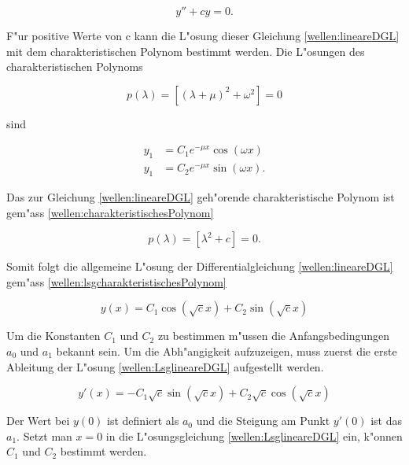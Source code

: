 \begin{refsection}
\begin{equation}
	y''+ cy = 0.
	\label{wellen:lineareDGL}
\end{equation}


F"ur positive Werte von c kann die L"osung dieser Gleichung 
\ref{wellen:lineareDGL} mit dem charakteristischen Polynom bestimmt werden. 
Die L"osungen des charakteristischen Polynoms

\begin{equation}
	p(\lambda) = [(\lambda+\mu)^2+\omega^2] =0
	\label{wellen:charakteristischesPolynom}
\end{equation}

sind

\begin{equation}
	\begin{split}
	y_1 &= C_1e^{-\mu x}\cos(\omega x) \\
	y_1 &= C_2e^{-\mu x}\sin(\omega x).
	\end{split}
	\label{wellen:lsgcharakteristischesPolynom}
\end{equation}

Das zur Gleichung \ref{wellen:lineareDGL} geh"orende charakteristische Polynom 
ist gem"ass \ref{wellen:charakteristischesPolynom}

\begin{equation*}
	p(\lambda) = [\lambda^2 + c] =0.
\end{equation*}

Somit folgt die allgemeine L"osung der Differentialgleichung 
\ref{wellen:lineareDGL} gem"ass \ref{wellen:lsgcharakteristischesPolynom}

\begin{equation}
	y(x) = C_1 \cos(\sqrt{c}x) + C_2 \sin(\sqrt{c}x)
	\label{wellen:LsglineareDGL}
\end{equation}

Um die Konstanten $C_1$ und $C_2$ zu bestimmen m"ussen die Anfangsbedingungen 
$a_0$ und $a_1$ bekannt sein. Um die Abh"angigkeit aufzuzeigen, muss zuerst die 
erste Ableitung der L"osung \ref{wellen:LsglineareDGL} aufgestellt werden.

\begin{equation}
	y'(x)=-C_1 \sqrt{c} \sin(\sqrt{c}x) + C_2 \sqrt{c} \cos(\sqrt{c}x)
\end{equation}

Der Wert bei $y(0)$ ist definiert als $a_0$ und die Steigung am Punkt $y'(0)$ 
ist das $a_1$. Setzt man $x=0$ in die L"osungsgleichung 
\ref{wellen:LsglineareDGL} ein, k"onnen $C_1$ und $C_2$ bestimmt werden.


\end{refsection}

